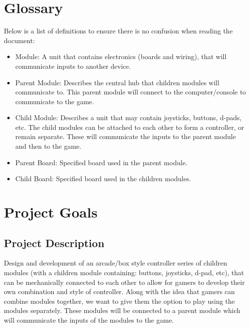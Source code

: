 \documentclass[a4]{article}
\begin{document}
\section{Glossary}
Below is a list of definitions to ensure there is no confusion when reading the document:
\begin{itemize}
	\item \textcolor{McMasterMaroon}{Module}: A unit that contains electronics (boards and wiring), that will communicate inputs to another device.
	\item \textcolor{McMasterMaroon}{Parent Module}: Describes the central hub that children modules will communicate to. This parent module will connect to the computer/console to communicate to the game.
	\item \textcolor{McMasterMaroon}{Child Module}: Describes a unit that may contain joysticks, buttons, d-pads, etc. The child modules can be attached to each other to form a controller, or remain separate. These will communicate the inputs to the parent module and then to the game.
	\item \textcolor{McMasterMaroon}{Parent Board}: Specified board used in the parent module.
	\item \textcolor{McMasterMaroon}{Child Board}: Specified board used in the children modules.
\end{itemize}
\section{Project Goals}
\subsection{Project Description}
Design and development of an arcade/box style controller series of children modules (with a children module containing: buttons, joysticks, d-pad, etc), that can be mechanically
connected to each other to allow for gamers to develop their own combination and style of controller. Along with the idea that gamers can combine modules together,
we want to give them the option to play using the modules separately. These modules will be connected to a parent module which will communicate the inputs of the
modules to the game.
\end{document}
